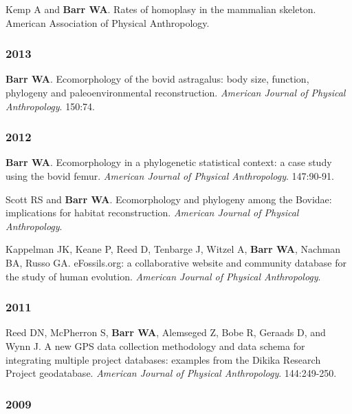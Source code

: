 \documentclass{article}
\begin{document}
\begin{etaremune}
\item Kemp A and {\bfseries Barr WA}. Rates of homoplasy in the mammalian skeleton. American Association of Physical Anthropology.

\subsubsection*{2013}

\item {\bfseries Barr WA}. Ecomorphology of the bovid astragalus: body size, function, phylogeny and paleoenvironmental reconstruction. \emph{American Journal of Physical Anthropology}. 150:74.

\subsubsection*{2012}

\item {\bfseries Barr WA}. Ecomorphology in a phylogenetic statistical context: a case study using the bovid femur. \emph{American Journal of Physical Anthropology}. 147:90-91.

\item Scott RS and {\bfseries Barr WA}. Ecomorphology and phylogeny among the Bovidae: implications for habitat reconstruction. \emph{American Journal of Physical Anthropology}.

\item Kappelman JK, Keane P, Reed D, Tenbarge J, Witzel A, {\bfseries Barr WA}, Nachman BA, Russo GA. eFossils.org: a collaborative website and community database for the study of human evolution. \emph{American Journal of Physical Anthropology}.

\subsubsection*{2011}

\item Reed DN, McPherron S, {\bfseries Barr WA}, Alemseged Z, Bobe R, Geraads D, and Wynn J. A new GPS data collection methodology and data schema for integrating multiple project databases: examples from the Dikika Research Project geodatabase. \emph{American Journal of Physical Anthropology}. 144:249-250.

\subsubsection*{2009}


\end{etaremune}
\end{document}
